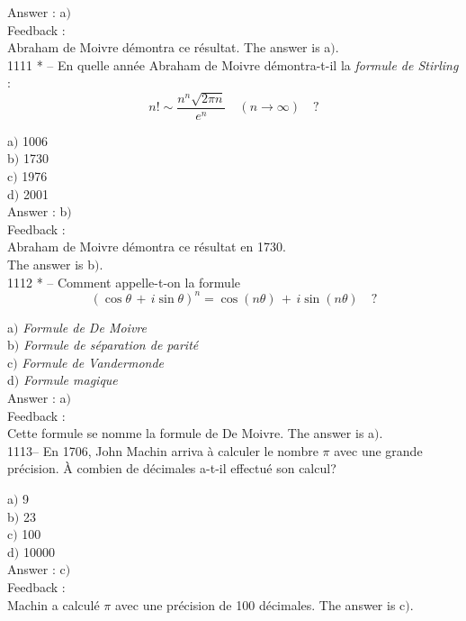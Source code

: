 \documentclass[letterpaper, 12pt]{article}
\begin{document}
Answer : a$)$\\

Feedback :\\
Abraham de Moivre d\'emontra ce r\'esultat.
The answer is a$)$.\\

1111 * -- En quelle ann\'ee Abraham de Moivre d\'emontra-t-il la
{\sl formule de Stirling} :
$$\displaystyle{n!\sim\frac{n^n\sqrt{2\pi n}}{e^n}\quad(n\to\infty)}\quad?$$

a$)$ 1006  \\
b$)$ 1730 \\
c$)$ 1976  \\
d$)$ 2001\\

Answer : b$)$\\

Feedback :\\
Abraham de Moivre d\'emontra ce r\'esultat en 1730. \\
The answer is b$)$.\\

1112 * -- Comment appelle-t-on la formule
$$(\cos\theta\,+\,i\sin\theta)^n=\cos(n\theta)\,+\,i\sin(n\theta)\quad?$$


a$)$ {\sl Formule de De Moivre} \\
b$)$ {\sl Formule de s\'eparation de parit\'e}  \\
c$)$ {\sl Formule de Vandermonde}  \\
d$)$ {\sl Formule magique}\\

Answer : a$)$\\

Feedback :\\
Cette formule se nomme la formule de De Moivre.
The answer is a$)$.\\

1113-- En 1706, John Machin arriva \`a calculer le nombre $\pi$ avec
une grande pr\'ecision. \`A combien de d\'ecimales a-t-il effectu\'e
son calcul?

a$)$ 9  \\
b$)$ 23 \\
c$)$ 100  \\
d$)$ 10000 \\

Answer : c$)$\\

Feedback :\\
Machin a calcul\'e $\pi$ avec une pr\'ecision de 100 d\'ecimales.
The answer is c$)$.\\
\end{document}

